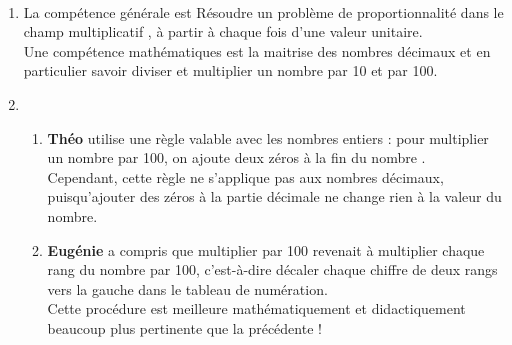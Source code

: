 \ \\ [-5mm]
\begin{enumerate}
   \item La compétence générale est \og Résoudre un problème de proportionnalité dans le champ multiplicatif \fg{}, à partir à chaque fois d'une valeur unitaire. \\
   Une compétence mathématiques est la maitrise des nombres décimaux et en particulier savoir diviser et multiplier un nombre par 10 et par 100.
   \item
   \begin{enumerate}
      \item {\bf Théo} utilise une règle valable avec les nombres entiers : \og pour multiplier un nombre par 100, on ajoute deux zéros à la fin du nombre \fg{}. \\
      Cependant, cette règle ne s'applique pas aux nombres décimaux, puisqu'ajouter des \og zéros \fg{} à la partie décimale ne change rien à la valeur du nombre.
      \item {\bf Eugénie} a compris que multiplier par 100 revenait à multiplier chaque rang du nombre par 100, c'est-à-dire décaler chaque chiffre de deux rangs vers la gauche dans le tableau de numération. \\
      Cette procédure est meilleure mathématiquement et didactiquement beaucoup plus pertinente que la précédente !
   \end{enumerate}
\end{enumerate}
